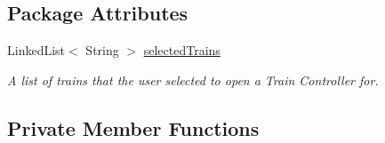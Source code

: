 \subsection*{Package Attributes}
\begin{DoxyCompactItemize}
\item 
Linked\+List$<$ String $>$ \hyperlink{classTrainControllerComps_1_1TCDispatchedTrainFrame_a494919f3599b6980433ef5d370119148}{selected\+Trains}
\begin{DoxyCompactList}\small\item\em A list of trains that the user selected to open a Train Controller for. \end{DoxyCompactList}\end{DoxyCompactItemize}
\subsection*{Private Member Functions}
